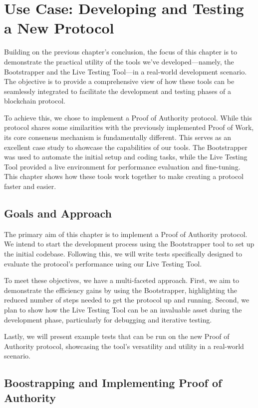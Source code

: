 \chapter{Use Case: Developing and Testing a New Protocol}

Building on the previous chapter's conclusion, the focus of this chapter is to demonstrate the practical utility of the tools we've developed—namely, the Bootstrapper and the Live Testing Tool—in a real-world development scenario. The objective is to provide a comprehensive view of how these tools can be seamlessly integrated to facilitate the development and testing phases of a blockchain protocol.

To achieve this, we chose to implement a Proof of Authority protocol. While this protocol shares some similarities with the previously implemented Proof of Work, its core consensus mechanism is fundamentally different. This serves as an excellent case study to showcase the capabilities of our tools. The Bootstrapper was used to automate the initial setup and coding tasks, while the Live Testing Tool provided a live environment for performance evaluation and fine-tuning. This chapter shows how these tools work together to make creating a protocol faster and easier.



\section{Goals and Approach}
The primary aim of this chapter is to implement a Proof of Authority protocol. We intend to start the development process using the Bootstrapper tool to set up the initial codebase. Following this, we will write tests specifically designed to evaluate the protocol's performance using our Live Testing Tool.

To meet these objectives, we have a multi-faceted approach. First, we aim to demonstrate the efficiency gains by using the Bootstrapper, highlighting the reduced number of steps needed to get the protocol up and running. Second, we plan to show how the Live Testing Tool can be an invaluable asset during the development phase, particularly for debugging and iterative testing.

Lastly, we will present example tests that can be run on the new Proof of Authority protocol, showcasing the tool's versatility and utility in a real-world scenario.

\section{Boostrapping and Implementing Proof of Authority}

